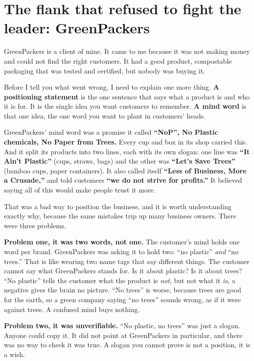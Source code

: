 \documentclass[10pt,twoside,openany]{memoir}
\newcommand{\needspacehead}{\needspace{4\baselineskip}}
\let\oldsection\section
\renewcommand{\section}{\needspacehead\oldsection}
\begin{document}
{\section{The flank that refused to fight the leader:
GreenPackers}\label{the-flank-that-refused-to-fight-the-leader-greenpackers}

GreenPackers is a client of mine. It came to me because it was not
making money and could not find the right customers. It had a good
product, compostable packaging that was tested and certified, but nobody
was buying it.

Before I tell you what went wrong, I need to explain one more thing.
\textbf{A positioning statement} is the one sentence that says what a
product is and who it is for. It is the single idea you want customers
to remember. \textbf{A mind word} is that one idea, the one word you
want to plant in customers' heads.

GreenPackers' mind word was a promise it called \textbf{``NoP'', No
Plastic chemicals, No Paper from Trees.} Every cup and box in its shop
carried this. And it split its products into two lines, each with its
own slogan: one line was \textbf{``It Ain't Plastic''} (cups, straws,
bags) and the other was \textbf{``Let's Save Trees''} (bamboo cups,
paper containers). It also called itself \textbf{``Less of Business,
More a Crusade,''} and told customers \textbf{``we do not strive for
profits.''} It believed saying all of this would make people trust it
more.

That was a bad way to position the business, and it is worth
understanding exactly why, because the same mistakes trip up many
business owners. There were three problems.

\textbf{Problem one, it was two words, not one.} The customer's mind
holds one word per brand. GreenPackers was asking it to hold two: ``no
plastic'' \emph{and} ``no trees.'' That is like wearing two name tags
that say different things. The customer cannot say what GreenPackers
stands for. Is it about plastic? Is it about trees? ``No plastic'' tells
the customer what the product is \emph{not}, but not what it \emph{is},
a negative gives the brain no picture. ``No trees'' is worse, because
trees are good for the earth, so a green company saying ``no trees''
sounds wrong, as if it were against trees. A confused mind buys nothing.

\textbf{Problem two, it was unverifiable.} ``No plastic, no trees'' was
just a slogan. Anyone could copy it. It did not point at GreenPackers in
particular, and there was no way to check it was true. A slogan you
cannot prove is not a position, it is a wish.

}
\end{document}
